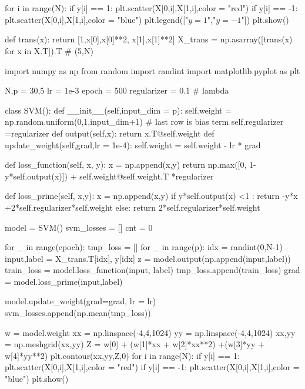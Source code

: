 \documentclass[10pt]{article}
\begin{document}
\section{}
\begin{python}
for i in range(N):
    if y[i] == 1:
        plt.scatter(X[0,i],X[1,i],color = "red")
    if y[i] == -1:
        plt.scatter(X[0,i],X[1,i],color = "blue")
plt.legend(["$y = 1$","$y = -1$"])
plt.show()

def trans(x):
    return [1,x[0],x[0]**2, x[1],x[1]**2]
X_trans = np.asarray([trans(x) for x in X.T]).T # (5,N)

import numpy as np
from random import randint
import matplotlib.pyplot as plt

N,p = 30,5
lr = 1e-3
epoch = 500
regularizer = 0.1 # lambda

class SVM():
    def __init__(self,input_dim = p):
        self.weight = np.random.uniform(0,1,input_dim+1) # last row is bias term
        self.regularizer =regularizer
    def output(self,x):
        return x.T@self.weight
    def update_weight(self,grad,lr = 1e-4):
        self.weight = self.weight - lr * grad

    def loss_function(self, x, y):
        x = np.append(x,y)
        return np.max([0, 1-y*self.output(x)]) + self.weight@self.weight.T *regularizer
    
    def loss_prime(self, x,y):
        x = np.append(x,y)
        if y*self.output(x) <1 : 
            return -y*x +2*self.regularizer*self.weight
        else:
            return 2*self.regularizer*self.weight

model = SVM()
svm_losses = []
cnt = 0

for _ in range(epoch):
    tmp_loss = []
    for _ in range(p):
        idx = randint(0,N-1)
        input,label = X_trans.T[idx], y[idx]
        z = model.output(np.append(input,label))
        train_loss = model.loss_function(input, label)
        tmp_loss.append(train_loss)
        grad = model.loss_prime(input,label)
        
        model.update_weight(grad=grad, lr = lr)
    svm_losses.append(np.mean(tmp_loss))

w = model.weight
xx = np.linspace(-4,4,1024)
yy = np.linspace(-4,4,1024)
xx,yy = np.meshgrid(xx,yy)
Z = w[0] + (w[1]*xx + w[2]*xx**2) +(w[3]*yy + w[4]*yy**2)
plt.contour(xx,yy,Z,0)
for i in range(N):
    if y[i] == 1:
        plt.scatter(X[0,i],X[1,i],color = "red")
    if y[i] == -1:
        plt.scatter(X[0,i],X[1,i],color = "blue")
plt.show()



\end{python}
\end{document}
